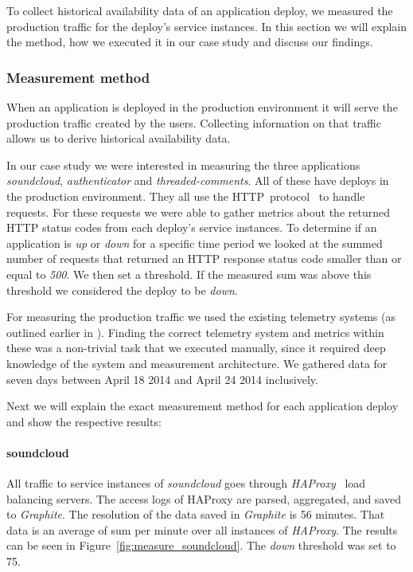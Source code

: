 To collect historical availability data of an application deploy, we measured the production traffic for the deploy's service instances. In this section we will explain the method, how we executed it in our case study and discuss our findings.

\subsubsection{Measurement method}

When an application is deployed in the production environment it will serve the production traffic created by the users. Collecting information on that traffic allows us to derive historical availability data.

In our case study we were interested in measuring the three applications \emph{soundcloud}, \emph{authenticator} and \emph{threaded-comments}. All of these have deploys in the production environment. They all use the HTTP~protocol~\cite{rfc2616} to handle requests. For these requests we were able to gather metrics about the returned HTTP status codes from each deploy's service instances. To determine if an application is \emph{up} or \emph{down} for a specific time period we looked at the summed number of requests that returned an HTTP response status code smaller than or equal to \emph{500}. We then set a threshold. If the measured sum was above this threshold we considered the deploy to be \emph{down}.

For measuring the production traffic we used the existing telemetry systems (as outlined earlier in ). Finding the correct telemetry system and metrics within these was a non-trivial task that we executed manually, since it required deep knowledge of the system and measurement architecture. We gathered data for seven days between April 18 2014 and April 24 2014 inclusively.

Next we will explain the exact measurement method for each application deploy and show the respective results:

\paragraph{soundcloud} All traffic to service instances of \emph{soundcloud} goes through \emph{HAProxy}~\cite{haproxy} load balancing servers. The access logs of HAProxy are parsed, aggregated, and saved to \emph{Graphite}. The resolution of the data saved in \emph{Graphite} is 56 minutes. That data is an average of sum per minute over all instances of \emph{HAProxy}. The results can be seen in Figure~\ref{fig:measure_soundcloud}. The \emph{down} threshold was set to 75.


